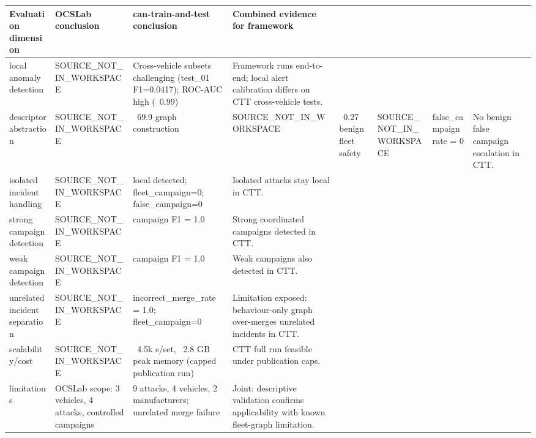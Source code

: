 \begin{tabular}{llll}
\toprule
Evaluation dimension & OCSLab conclusion & can-train-and-test conclusion & Combined evidence for framework \\
\midrule
local anomaly detection & SOURCE_NOT_IN_WORKSPACE & Cross-vehicle subsets challenging (test_01 F1=0.0417); ROC-AUC high (~0.99) & Framework runs end-to-end; local alert calibration differs on CTT cross-vehicle tests. \\
descriptor abstraction & SOURCE_NOT_IN_WORKSPACE & ~69.9%
graph construction & SOURCE_NOT_IN_WORKSPACE & ~0.27%
benign fleet safety & SOURCE_NOT_IN_WORKSPACE & false_campaign rate = 0 & No benign false campaign escalation in CTT. \\
isolated incident handling & SOURCE_NOT_IN_WORKSPACE & local detected; fleet_campaign=0; false_campaign=0 & Isolated attacks stay local in CTT. \\
strong campaign detection & SOURCE_NOT_IN_WORKSPACE & campaign F1 = 1.0 & Strong coordinated campaigns detected in CTT. \\
weak campaign detection & SOURCE_NOT_IN_WORKSPACE & campaign F1 = 1.0 & Weak campaigns also detected in CTT. \\
unrelated incident separation & SOURCE_NOT_IN_WORKSPACE & incorrect_merge_rate = 1.0; fleet_campaign=0 & Limitation exposed: behaviour-only graph over-merges unrelated incidents in CTT. \\
scalability/cost & SOURCE_NOT_IN_WORKSPACE & ~4.5k s/set, ~2.8 GB peak memory (capped publication run) & CTT full run feasible under publication caps. \\
limitations & OCSLab scope: 3 vehicles, 4 attacks, controlled campaigns & 9 attacks, 4 vehicles, 2 manufacturers; unrelated merge failure & Joint: descriptive validation confirms applicability with known fleet-graph limitation. \\
\bottomrule
\end{tabular}
